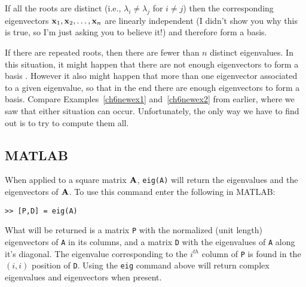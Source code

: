If all the roots are distinct (i.e., $\lambda_i \ne \lambda_j$ for $i
\ne j$) then the corresponding eigenvectors ${\bf x}_1,{\bf x}_2,\ldots,{\bf x}_n$
are linearly independent (I didn't show you why this is true, so I'm
just asking you to believe it!) and therefore form a basis.

If there are repeated roots, then there are fewer than $n$ distinct
eigenvalues. In this situation, it might happen that there are not
enough eigenvectors to form a basis . However it also might happen that
more than one eigenvector associated to a given eigenvalue, so that in
the end there are enough eigenvectors to form a basis. 
Compare Examples~\ref{ch6newex1} and~\ref{ch6newex2} from earlier, 
where we saw that either situation can occur. Unfortunately,
the only way we have to find out is to try to compute them all.

\subsection{MATLAB}
\label{s_MATeig}

When applied to a square matrix $\bf A$, {\tt eig(A)} will return the
eigenvalues and the eigenvectors of $\bf A$. To use this command enter
the following in MATLAB:
\begin{verbatim}
>> [P,D] = eig(A)
\end{verbatim}
What will be returned is a matrix {\tt P} with the normalized (unit
length) eigenvectors of {\tt A} in its columns, and a matrix {\tt D}
with the eigenvalues of {\tt A} along it's diagonal. The eigenvalue
corresponding to the $i^{th}$ column of {\tt P} is found in the
$(i,i)$ position of {\tt D}. Using the {\tt eig} command 
above will return complex eigenvalues and eigenvectors when present. 

\vspace{2mm}

